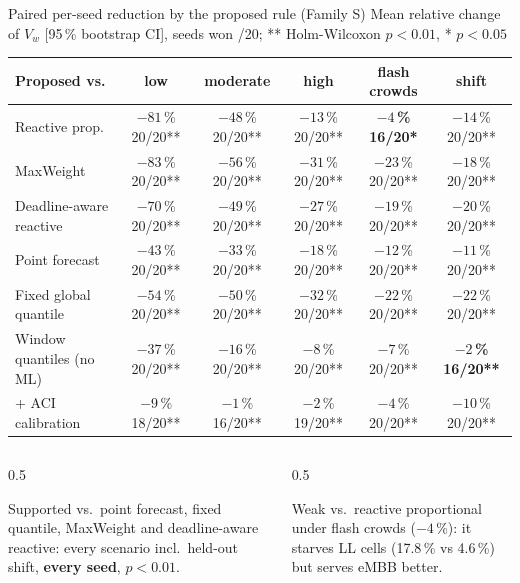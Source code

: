 \documentclass[aspectratio=169,11pt,xcolor=table]{beamer}
\newcommand{\hl}[1]{\textcolor{accent}{\textbf{#1}}}
\begin{document}
\begin{frame}{Paired per-seed reduction by the proposed rule (Family S)}
  \scriptsize
  \centering
  Mean relative change of $V_w$ [95\,\% bootstrap CI], seeds won /20; ** Holm-Wilcoxon $p<0.01$, * $p<0.05$\\[4pt]
  \begin{tabular}{lccccc}
    \toprule
    Proposed vs. & low & moderate & high & flash crowds & shift \\
    \midrule
    Reactive prop. & $-81$\,\% 20/20** & $-48$\,\% 20/20** & $-13$\,\% 20/20** & \hl{$-4$\,\% 16/20*} & $-14$\,\% 20/20** \\
    MaxWeight & $-83$\,\% 20/20** & $-56$\,\% 20/20** & $-31$\,\% 20/20** & $-23$\,\% 20/20** & $-18$\,\% 20/20** \\
    Deadline-aware reactive & $-70$\,\% 20/20** & $-49$\,\% 20/20** & $-27$\,\% 20/20** & $-19$\,\% 20/20** & $-20$\,\% 20/20** \\
    Point forecast & $-43$\,\% 20/20** & $-33$\,\% 20/20** & $-18$\,\% 20/20** & $-12$\,\% 20/20** & $-11$\,\% 20/20** \\
    Fixed global quantile & $-54$\,\% 20/20** & $-50$\,\% 20/20** & $-32$\,\% 20/20** & $-22$\,\% 20/20** & $-22$\,\% 20/20** \\
    Window quantiles (no ML) & $-37$\,\% 20/20** & $-16$\,\% 20/20** & $-8$\,\% 20/20** & $-7$\,\% 20/20** & \hl{$-2$\,\% 16/20**} \\
    + ACI calibration & $-9$\,\% 18/20** & $-1$\,\% 16/20** & $-2$\,\% 19/20** & $-4$\,\% 20/20** & $-10$\,\% 20/20** \\
    \bottomrule
  \end{tabular}
  \normalsize
  \vspace{0.5em}
  \begin{columns}[T]
    \begin{column}{0.5\textwidth}
      \begin{exampleblock}{Supported}
        \small vs.\ point forecast, fixed quantile, MaxWeight and deadline-aware reactive: every scenario incl.\ held-out shift, \textbf{every seed}, $p<0.01$.
      \end{exampleblock}
    \end{column}
    \begin{column}{0.5\textwidth}
      \begin{alertblock}{Weak}
        \small vs.\ reactive proportional under flash crowds ($-4$\,\%): it starves LL cells (17.8\,\% vs 4.6\,\%) but serves eMBB better.
      \end{alertblock}
    \end{column}
  \end{columns}
\end{frame}
\end{document}
